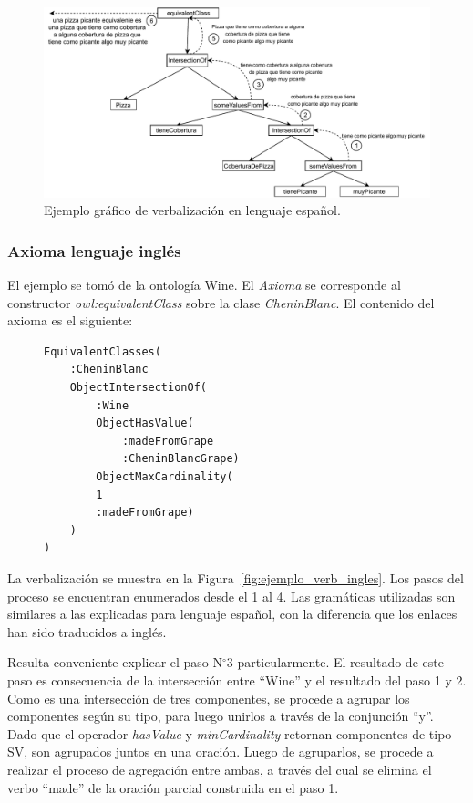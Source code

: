 \begin{figure}
    \centering
    \includegraphics[width=\textwidth]{img/generacion_documento/verbalizacion_equivalentClass_spanish.pdf}
    \caption{Ejemplo gráfico de verbalización en lenguaje español.}
    \label{fig:ejemplo_verb_espaniol}
\end{figure}

\subsubsection{Axioma lenguaje inglés}
El ejemplo se tomó de la ontología Wine. El \textit{Axioma} se corresponde al constructor \emph{owl:equivalentClass} sobre la clase \emph{CheninBlanc}. El contenido del axioma es el siguiente: 

\begin{figure}[H]
\begin{verbatim}
EquivalentClasses(
    :CheninBlanc
    ObjectIntersectionOf(
        :Wine
        ObjectHasValue(
            :madeFromGrape
            :CheninBlancGrape)
        ObjectMaxCardinality(
        1
        :madeFromGrape)
    )
)
\end{verbatim}
\end{figure}
La verbalización se muestra en la Figura~\ref{fig:ejemplo_verb_ingles}.
Los pasos del proceso se encuentran enumerados desde el 1 al 4. Las gramáticas utilizadas son similares a las explicadas para lenguaje español, con la diferencia que los enlaces han sido traducidos a inglés.

Resulta conveniente explicar el paso N$^\circ$3 particularmente. El resultado de este paso es consecuencia de la intersección entre ``Wine'' y el resultado del paso 1 y 2. 
Como es una intersección de tres componentes, se procede a agrupar los componentes según su tipo, para luego unirlos a través de la conjunción ``y''. Dado que el operador \emph{hasValue} y \emph{minCardinality} retornan componentes de tipo SV, son agrupados juntos en una oración. Luego de agruparlos, se procede a realizar el proceso de agregación entre ambas, a través del cual se elimina el verbo ``made'' de la oración parcial construida en el paso 1. 

